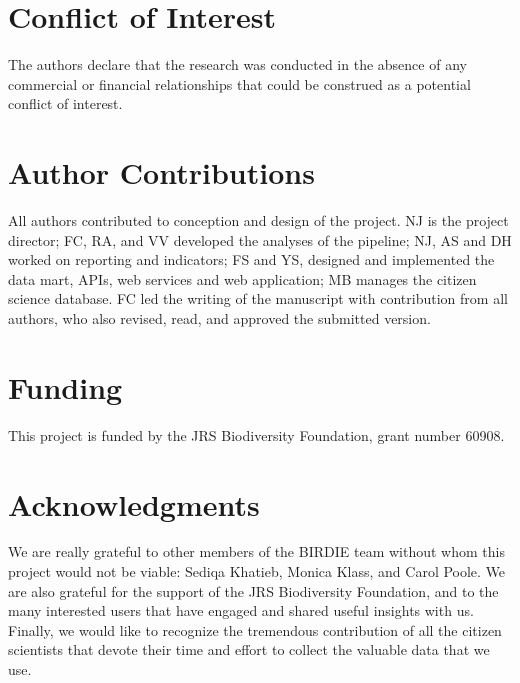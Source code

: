 \documentclass[utf8]{frontiersSCNS}
\begin{document}
\hypertarget{conflict-of-interest}{%
\section*{Conflict of Interest}\label{conflict-of-interest}}

The authors declare that the research was conducted in the absence of
any commercial or financial relationships that could be construed as a
potential conflict of interest.

\hypertarget{author-contributions}{%
\section*{Author Contributions}\label{author-contributions}}

All authors contributed to conception and design of the project. NJ is
the project director; FC, RA, and VV developed the analyses of the
pipeline; NJ, AS and DH worked on reporting and indicators; FS and YS,
designed and implemented the data mart, APIs, web services and web
application; MB manages the citizen science database. FC led the writing
of the manuscript with contribution from all authors, who also revised,
read, and approved the submitted version.

\hypertarget{funding}{%
\section*{Funding}\label{funding}}

This project is funded by the JRS Biodiversity Foundation, grant number
60908.

\hypertarget{acknowledgments}{%
\section*{Acknowledgments}\label{acknowledgments}}

We are really grateful to other members of the BIRDIE team without whom
this project would not be viable: Sediqa Khatieb, Monica Klass, and
Carol Poole. We are also grateful for the support of the JRS
Biodiversity Foundation, and to the many interested users that have
engaged and shared useful insights with us. Finally, we would like to
recognize the tremendous contribution of all the citizen scientists that
devote their time and effort to collect the valuable data that we use.
\end{document}
